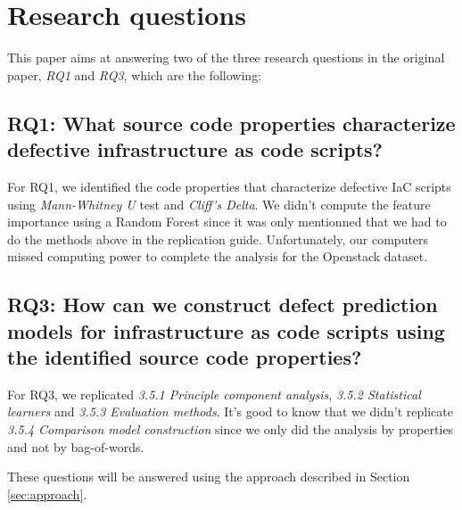 
\section{Research questions}
\label{sec:research-questions}
This paper aims at answering two of the three research questions in the original paper, \textit{RQ1} and \textit{RQ3}, which are the following:
\subsection{RQ1: What source code properties characterize defective infrastructure as code scripts?}
For RQ1, we identified the code properties that characterize defective IaC scripts
using \emph{Mann-Whitney U} test and \emph{Cliff's Delta}. We didn't
compute the feature importance using a Random Forest since it was only mentionned
that we had to do the methods above in the replication guide. Unfortunately,
our computers missed computing power to complete the analysis for the Openstack
dataset.
\subsection{RQ3: How can we construct defect prediction models for
infrastructure as code scripts using the identified source code properties?}
For RQ3, we replicated \emph{3.5.1 Principle component analysis},
\emph{3.5.2 Statistical learners} and \emph{3.5.3 Evaluation methods}. It's good
to know that we didn't replicate \emph{3.5.4 Comparison model construction} since
we only did the analysis by properties and not by bag-of-words.

These questions will be answered using the approach described in Section \ref{sec:approach}.
